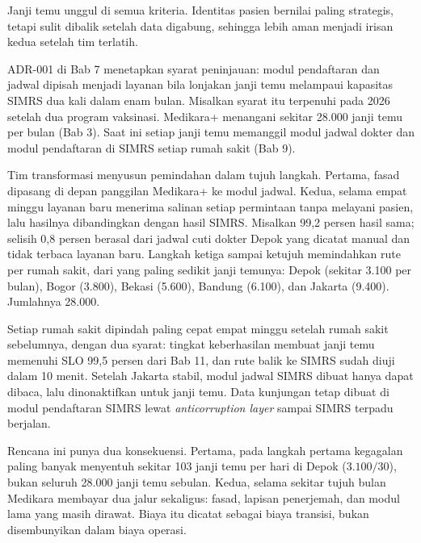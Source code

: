 Janji temu unggul di semua kriteria. Identitas pasien bernilai paling strategis, tetapi sulit
dibalik setelah data digabung, sehingga lebih aman menjadi irisan kedua setelah tim terlatih.

\begin{kasus}[title={Kasus Medikara Health: Memindahkan Janji Temu tanpa Menghentikan Rumah Sakit}]
  ADR-001 di Bab 7 menetapkan syarat peninjauan: modul pendaftaran dan jadwal dipisah menjadi
  layanan bila lonjakan janji temu melampaui kapasitas SIMRS dua kali dalam enam bulan. Misalkan
  syarat itu terpenuhi pada 2026 setelah dua program vaksinasi. Medikara+ menangani sekitar 28.000
  janji temu per bulan (Bab 3). Saat ini setiap janji temu memanggil modul jadwal dokter dan modul
  pendaftaran di SIMRS setiap rumah sakit (Bab 9).

  Tim transformasi menyusun pemindahan dalam tujuh langkah. Pertama, fasad dipasang di depan
  panggilan Medikara+ ke modul jadwal. Kedua, selama empat minggu layanan baru menerima salinan
  setiap permintaan tanpa melayani pasien, lalu hasilnya dibandingkan dengan hasil SIMRS. Misalkan
  99,2 persen hasil sama; selisih 0,8 persen berasal dari jadwal cuti dokter Depok yang dicatat
  manual dan tidak terbaca layanan baru. Langkah ketiga sampai ketujuh memindahkan rute per rumah
  sakit, dari yang paling sedikit janji temunya: Depok (sekitar 3.100 per bulan), Bogor (3.800),
  Bekasi (5.600), Bandung (6.100), dan Jakarta (9.400). Jumlahnya 28.000.

  Setiap rumah sakit dipindah paling cepat empat minggu setelah rumah sakit sebelumnya, dengan dua
  syarat: tingkat keberhasilan membuat janji temu memenuhi SLO 99,5 persen dari Bab 11, dan rute
  balik ke SIMRS sudah diuji dalam 10 menit. Setelah Jakarta stabil, modul jadwal SIMRS dibuat hanya
  dapat dibaca, lalu dinonaktifkan untuk janji temu. Data kunjungan tetap dibuat di modul
  pendaftaran SIMRS lewat \textit{anticorruption layer} sampai SIMRS terpadu berjalan.

  Rencana ini punya dua konsekuensi. Pertama, pada langkah pertama kegagalan paling banyak menyentuh
  sekitar 103 janji temu per hari di Depok ($3.100 / 30$), bukan seluruh 28.000 janji temu sebulan.
  Kedua, selama sekitar tujuh bulan Medikara membayar dua jalur sekaligus: fasad, lapisan penerjemah,
  dan modul lama yang masih dirawat. Biaya itu dicatat sebagai biaya transisi, bukan disembunyikan
  dalam biaya operasi.
\end{kasus}

